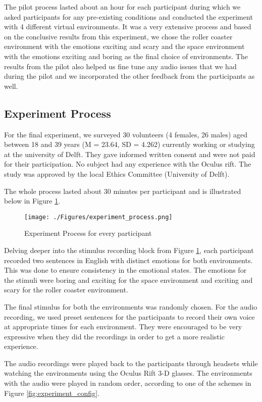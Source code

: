 \documentclass[Method.tex]{subfiles}
\begin{document}
The pilot process lasted about an hour for each participant during which we asked participants for any pre-existing conditions and conducted the experiment with 4 different virtual environments. It was a very extensive process and based on the conclusive results from this experiment, we chose the roller coaster environment with the emotions exciting and scary and the space environment with the emotions exciting and boring as the final choice of environments. The results from the pilot also helped us fine tune any audio issues that we had during the pilot and we incorporated the other feedback from the participants as well.

\subsection{Experiment Process}
For the final experiment, we surveyed 30 volunteers (4 females, 26 males) aged between 18 and 39 years (M = 23.64, SD = 4.262) currently working or studying at the university of Delft. They gave informed written consent and were not paid for their participation. No subject had any experience with the Oculus rift. The study was approved by the local Ethics Committee (University of Delft).

The whole process lasted about 30 minutes per participant and is illustrated below in Figure \ref{fig:experiment_process}.

\begin{figure} [H]
	\centering
	\texttt{[image: ./Figures/experiment\_process.png]}
	\caption{Experiment Process for every participant}
	\label{fig:experiment_process}
\end{figure}

Delving deeper into the stimulus recording block from Figure \ref{fig:experiment_process}, each participant recorded two sentences in English with distinct emotions for both environments. This was done to ensure consistency in the emotional states. The emotions for the stimuli were boring and exciting for the space environment and exciting and scary for the roller coaster environment. 

The final stimulus for both the environments was randomly chosen. For the audio recording, we used preset sentences for the participants to record their own voice  at appropriate times for each environment. They were encouraged to be very expressive when they did the recordings in order to get a more realistic experience.

The audio recordings were played back to the participants through headsets while watching the environments using the Oculus Rift 3-D glasses. The environments with the audio were played in random order, according to one of the schemes in Figure \ref{fig:experiment_config}. 
\end{document}
